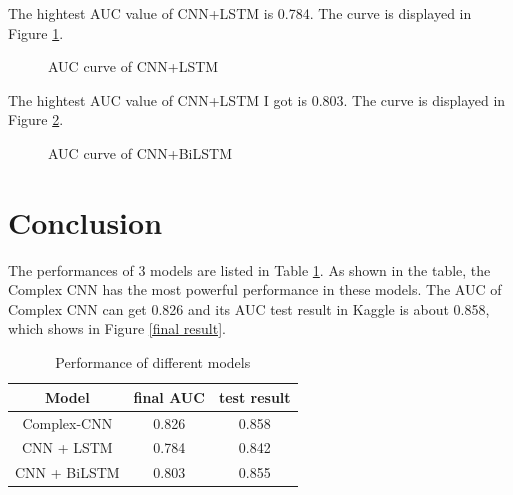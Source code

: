 \documentclass{article}
\begin{document}
The hightest AUC value of CNN+LSTM is 0.784. The curve is displayed in Figure \ref{CNN+LSTM}.

\begin{figure}[h]
	\centering
	\caption{AUC curve of CNN+LSTM}
	\label{CNN+LSTM}
\end{figure} 

The hightest AUC value of CNN+LSTM I got is 0.803. The curve is displayed in Figure \ref{CNN+BiLSTM}.
\begin{figure}[h]
	\centering
	\caption{AUC curve of CNN+BiLSTM}
	\label{CNN+BiLSTM}
\end{figure} 

\section{Conclusion}
The performances of 3 models are listed in Table \ref{table 1}. As shown in the table, the Complex CNN has the most powerful performance in these models. The AUC of Complex CNN can get 0.826 and its AUC test result in Kaggle is about 0.858, which shows in Figure \ref{final result}. 
\begin{table} [h]
  \caption{Performance of different models}
  \label{table 1}
  \centering
  \begin{tabular}{c|c|c}
    \toprule
   	Model   	& \quad final AUC \quad &\quad test result \quad \\
    \midrule 
	Complex-CNN & 0.826 & 0.858\\
	CNN + LSTM  & 0.784 & 0.842\\
	CNN + BiLSTM& 0.803 & 0.855\\
    \bottomrule
  \end{tabular}
\end{table}
\end{document}
